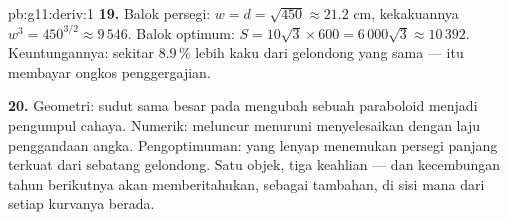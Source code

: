 \begin{solution}{pb:g11:deriv:1}
\textbf{19.} Balok persegi: $w = d = \sqrt{450} \approx 21.2$
cm, kekakuannya $w^3 = 450^{3/2} \approx 9\,546$. Balok optimum:
$S = 10\sqrt3 \times 600 = 6\,000\sqrt3 \approx 10\,392$. Keuntungannya:
sekitar $8.9\,\%$ lebih kaku dari gelondong yang sama ---  itu
membayar ongkos penggergajian.

\textbf{20.} Geometri: sudut sama besar pada  mengubah
sebuah paraboloid menjadi pengumpul cahaya. Numerik: meluncur menuruni
 menyelesaikan  dengan laju penggandaan angka.
Pengoptimuman:  yang lenyap menemukan persegi panjang terkuat dari
sebatang gelondong. Satu objek, tiga keahlian --- dan kecembungan tahun
berikutnya akan memberitahukan, sebagai tambahan, di sisi mana dari setiap
 kurvanya berada.

\end{solution}
